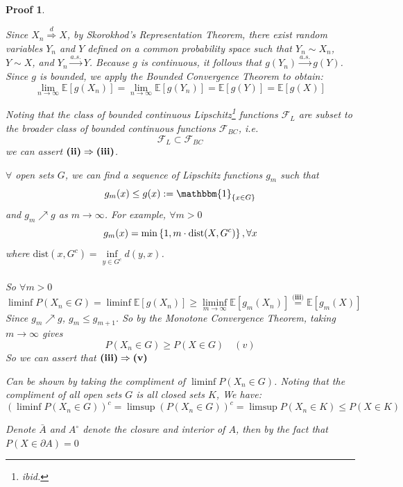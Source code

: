 \documentclass[11pt]{article}
\newtheorem*{Proof}{Proof}
\newcommand{\ind}{\mathbbm{1}}
\begin{document}
\begin{Proof}\par
\noindent
\begin{description}[style=nextline,leftmargin=!,labelwidth=4cm]
 \item[(i)$\Rightarrow$(ii)] Since $X_n \overset{d}{\Rightarrow} X$, by Skorokhod's Representation Theorem, there exist random variables $Y_n$ and $Y$ defined on a common probability space such that $Y_n \sim X_n$, $Y \sim X$, and $Y_n \xrightarrow{a.s.} Y$. Because $g$ is continuous, it follows that $g(Y_n) \xrightarrow{a.s.} g(Y)$. Since $g$ is bounded, we apply the Bounded Convergence Theorem to obtain:
$$ \lim_{n \rightarrow \infty} \mathbb{E}[g(X_n)] = \lim_{n \rightarrow \infty} \mathbb{E}[g(Y_n)] = \mathbb{E}[g(Y)] = \mathbb{E}[g(X)] $$
  \item[(ii)$\Rightarrow$(iii)] Noting that the class of bounded continuous Lipschitz\footnote{ibid.} functions $\mathcal{F}_{L}$ are subset to the broader class of bounded continuous functions $\mathcal{F}_{BC}$, i.e. $$\mathcal{F}_L \subset \mathcal{F}_{BC}$$ we can assert $\textnormal{\textbf{(ii)}} \Rightarrow \textnormal{\textbf{(iii)}}$.
  \item[(iii)$\Rightarrow$(v)]  $\forall$ open sets $G$, we can find a sequence of Lipschitz functions $g_m$ such that $$g_m(x) \le g(x) := \ind_{\left\{x \in G\right\}}$$
  and $g_m\nearrow g$ as $m \rightarrow \infty$. For example, $\forall m > 0$ 
  $$
  g_m(x) = \min \left\{1, m\cdot \text{dist}(X, G^c) \right\}, \space \forall x
  $$
  where $\text{dist}(x, G^c) = \underset{y \in G^c}{\inf}d(y,x)$.
  \\
  \\
  So $\forall m >0$
  $$
  \liminf P(X_n \in G) = \liminf \mathbb{E}[g(X_n)] \ge \liminf_{m \rightarrow \infty} \mathbb{E}[g_m(X_n)] \overset{\textbf{(iii)}}{=}\mathbb{E}[g_m(X)] 
  $$
  Since $g_m \nearrow g$, $g_m \le g_{m+1}$. So by the Monotone Convergence Theorem, taking $m \rightarrow \infty$ gives $$P(X_n \in G) \ge P(X \in G) \quad (v)$$
  So we can assert that $\textnormal{\textbf{(iii)}} \Rightarrow \textnormal{\textbf{(v)}}$
  \item[(v)$\Rightarrow$(vi)] Can be shown by taking the compliment of $\liminf P(X_n \in G)$. Noting that the compliment of all open sets $G$ is all closed sets $K$, We have:
  $$
  (\liminf P(X_n \in G))^c = \limsup (P(X_n \in G))^c = \limsup P(X_n \in K) \le P(X\in K)
  $$
  \item[(v)+(vi)$\Rightarrow$(vii)] Denote $\bar{A}$ and $A^\circ$ denote the closure and interior of $A$, then by the fact that $P(X \in \partial A) = 0$

\end{description}
\end{Proof}
\end{document}
